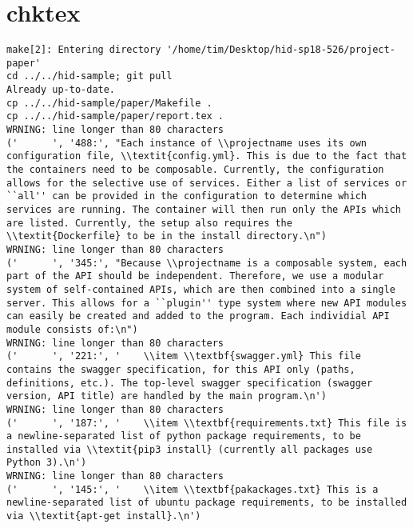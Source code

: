 \appendix
\section{chktex}
\begin{tiny}
\begin{verbatim}
make[2]: Entering directory '/home/tim/Desktop/hid-sp18-526/project-paper'
cd ../../hid-sample; git pull
Already up-to-date.
cp ../../hid-sample/paper/Makefile .
cp ../../hid-sample/paper/report.tex .
WRNING: line longer than 80 characters
('      ', '488:', "Each instance of \\projectname uses its own configuration file, \\textit{config.yml}. This is due to the fact that the containers need to be composable. Currently, the configuration allows for the selective use of services. Either a list of services or ``all'' can be provided in the configuration to determine which services are running. The container will then run only the APIs which are listed. Currently, the setup also requires the \\textit{Dockerfile} to be in the install directory.\n")
WRNING: line longer than 80 characters
('      ', '345:', "Because \\projectname is a composable system, each part of the API should be independent. Therefore, we use a modular system of self-contained APIs, which are then combined into a single server. This allows for a ``plugin'' type system where new API modules can easily be created and added to the program. Each individial API module consists of:\n")
WRNING: line longer than 80 characters
('      ', '221:', '    \\item \\textbf{swagger.yml} This file contains the swagger specification, for this API only (paths, definitions, etc.). The top-level swagger specification (swagger version, API title) are handled by the main program.\n')
WRNING: line longer than 80 characters
('      ', '187:', '    \\item \\textbf{requirements.txt} This file is a newline-separated list of python package requirements, to be installed via \\textit{pip3 install} (currently all packages use Python 3).\n')
WRNING: line longer than 80 characters
('      ', '145:', '    \\item \\textbf{pakackages.txt} This is a newline-separated list of ubuntu package requirements, to be installed via \\textit{apt-get install}.\n')

\end{verbatim}
\end{tiny}
